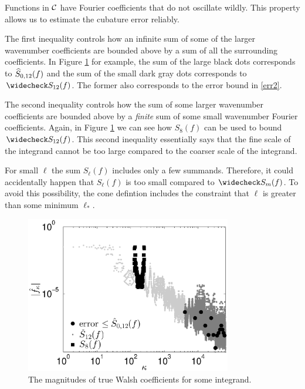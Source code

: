 \documentclass[graybox]{svmult}
\begin{document}
Functions in $\mathcal{C}$ have Fourier coefficients that do not oscillate wildly.  This property allows us to estimate the cubature error reliably. 

The first inequality controls how an infinite sum of some of the larger wavenumber coefficients are bounded above by a sum of all the surrounding coefficients.  In Figure \ref{Walshcoeffig} for example, the sum of the large black dots corresponds to $\widehat{S}_{0,12}(f)$ and the sum of the small dark gray dots corresponds to $\wcS_{12}(f)$. The former also corresponds to the error bound in \eqref{err2}.

The second inequality controls how the sum of some  larger wavenumber coefficients are bounded above by a \emph{finite} sum of some small wavenumber Fourier coefficients. Again, in Figure \ref{Walshcoeffig} we can see how $S_8(f)$ can be used to bound $\wcS_{12}(f)$. This second inequality essentially says that the fine scale of the integrand cannot be too large compared to the coarser scale of the integrand.

For small $\ell$ the sum $S_\ell(f)$ includes only a few summands. Therefore, it could accidentally happen that $S_\ell(f)$ is too small compared to $\wcS_m(f)$. To avoid this possibility, the cone defintion includes the constraint that $\ell$ is greater than some minimum $\ell_*$.

\begin{figure}
\centering
\includegraphics[width=9cm]{Images/PlotFFTCoefUse256.eps}
\caption{The magnitudes of true Walsh coefficients for some integrand. \label{Walshcoeffig}}
\end{figure}
\end{document}
